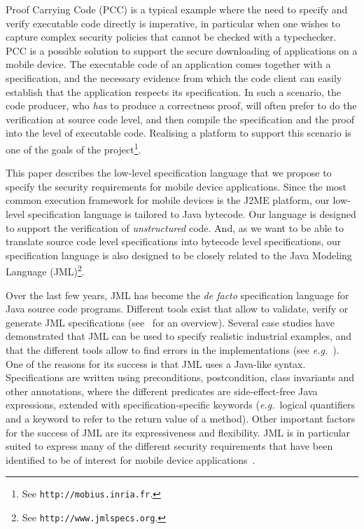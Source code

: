 Proof Carrying Code (PCC) is a typical example where the need to
specify and verify executable code directly is imperative, in
particular when one wishes to capture complex security policies that
cannot be checked with a typechecker.  PCC is a possible solution to
support the secure downloading of applications on a mobile device. The
executable code of an application comes together with a specification,
and the necessary evidence from which the code client can easily
establish that the application respects its specification. In such a
scenario, the code producer, who \emph{has} to produce a correctness
proof, will often prefer to do the verification at source code level,
and then compile the specification and the proof into the level of
executable code. Realising a platform to support this scenario is one
of the goals of the \mobius project\footnote{See
\texttt{http://mobius.inria.fr}.}. 

This paper describes the low-level specification language that we
propose to specify the security requirements for mobile device
applications. Since the most common execution framework for mobile
devices is the J2ME platform, our low-level specification language is
tailored to Java bytecode. Our language is designed to support the
verification of \emph{unstructured} code. And, as we want to be able to
translate source code level specifications into bytecode level
specifications, our specification language is also designed to be
closely related to the Java Modeling Language (JML)\footnote{See
\texttt{http://www.jmlspecs.org}.}.


Over the last few years, JML has become the \emph{de facto}
specification language for Java source code programs. Different tools
exist that allow to validate, verify or generate JML specifications
(see~\cite{BurdyCCEKLLP05} for an overview). Several case studies have
demonstrated that JML can be used to specify realistic industrial
examples, and that the different tools allow to find errors in the
implementations (see \emph{e.g.}~\cite{BreunesseCHJ04}). One of the
reasons for its success is that JML uses a Java-like
syntax. Specifications are written using preconditions, postcondition,
class invariants and other annotations, where the different predicates
are side-effect-free Java expressions, extended with
specification-specific keywords (\emph{e.g.}\ logical quantifiers and
a keyword to refer to the return value of a method). Other important
factors for the success of JML are its expressiveness and
flexibility. JML is in particular suited to express many of the
different security requirements that have been identified to be of
interest for mobile device applications~\cite{Deliverable1.2}.


